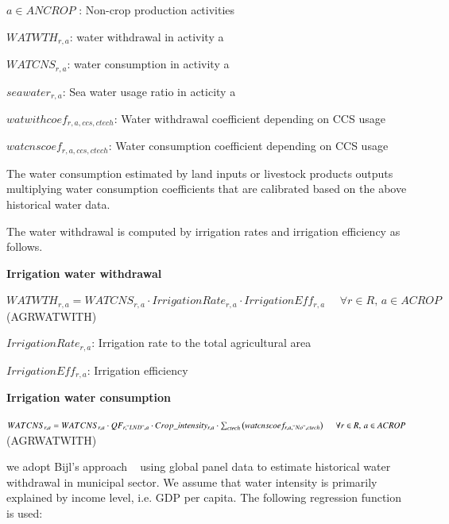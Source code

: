 \documentclass[10pt,a4paper,titlepage,dvipdfmx]{book}
\begin{document}
\begin{flushleft}
$a\in ANCROP$ : Non-crop production activities

$WATWTH_{r,a}$: water withdrawal in activity a

$WATCNS_{r,a}$: water consumption in activity a

$seawater_{r,a}$: Sea water usage ratio in acticity a

$watwithcoef_{r,a,ccs,ctech}$: Water withdrawal coefficient depending on CCS usage

$watcnscoef_{r,a,ccs,ctech}$: Water consumption coefficient depending on CCS usage
\end{flushleft}

The water consumption estimated by land inputs or livestock products outputs multiplying water consumption coefficients that are calibrated based on the above historical water data.

The water withdrawal is computed by irrigation rates and irrigation efficiency as follows.

\begin{flushleft}\textbf{Irrigation water withdrawal}\end{flushleft}


\begin{center}$WATWTH_{r,a}=WATCNS_{r,a}\cdot IrrigationRate_{r,a}\cdot IrrigationEff_{r,a}\,\,\,\,\,\,\,\,\forall r\in R,\,a\in ACROP$ (AGRWATWITH)
\end{center}

\begin{flushleft}
$IrrigationRate_{r,a}$: Irrigation rate to the total agricultural area

$IrrigationEff_{r,a}$: Irrigation efficiency 
\end{flushleft}

\begin{flushleft}\textbf{Irrigation water consumption}\end{flushleft}


\begin{center}$WATCNS_{r,a}=WATCNS_{r,a}\cdot QF_{r,"LND",a}\cdot Crop\_ intensity_{r,a}\cdot \sum _{ctech}\left(watcnscoef_{r,a,"No",ctech}\right)\,\,\,\,\,\,\,\,\forall r\in R,\,a\in ACROP$ (AGRWATWITH)
\end{center}

we adopt Bijl's approach ~\cite{RN2682} using global panel data to estimate historical water withdrawal in municipal sector. We assume that water intensity is primarily explained by income level, i.e. GDP per capita. The following regression function is used:
\end{document}
